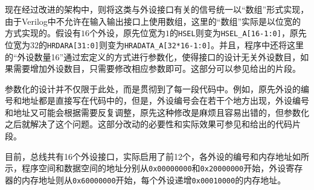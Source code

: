 现在经过改进的架构中，则将这类与外设接口有关的信号统一以“数组”形式实现，由于Verilog中不允许在输入输出接口上使用数组，这里的“数组”实际是以位宽的方式实现的。假设有$16$个外设，原先位宽为$1$的\texttt{HSEL}则变为\texttt{HSEL\_A[16-1:0]}，原先位宽为$32$的\texttt{HRDARA[31:0]}则变为\texttt{HRADATA\_A[32*16-1:0]}。并且，程序中还将这里的“外设数量16”通过宏定义的方式进行参数化，使得接口的设计无关外设数目，如果需要增加外设数目，只需要修改相应参数即可。这部分可以参见给出的片段。



参数化的设计并不仅限于此处，而是贯彻到了每一段代码中。例如，原先外设的编号和地址都是直接写在代码中的，但是，外设编号会在若干个地方出现，外设编号和地址又可能会根据需要反复调整，原先这种修改是麻烦且容易出错的，但参数化之后就解决了这个问题。这部分改动的必要性和实际效果可参见和给出的代码片段。





目前，总线共有16个外设接口，实际启用了前12个，各外设的编号和内存地址如所示，程序空间和数据空间的地址分别从\texttt{0x00000000}和\texttt{0x20000000}开始，外设寄存器的内存地址则从\texttt{0x60000000}开始，每个外设递增\texttt{0x00010000}的内存地址。


